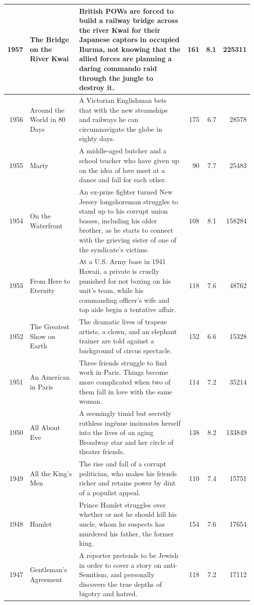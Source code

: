 \documentclass[
]{book}
\begin{document}
\begin{tabular}{r|l|l|r|r|r}
\hline
1957 & The Bridge on the River Kwai & British POWs are forced to build a railway bridge across the river Kwai for their Japanese captors in occupied Burma, not knowing that the allied forces are planning a daring commando raid through the jungle to destroy it. & 161 & 8.1 & 225311\\
\hline
1956 & Around the World in 80 Days & A Victorian Englishman bets that with the new steamships and railways he can circumnavigate the globe in eighty days. & 175 & 6.7 & 28578\\
\hline
1955 & Marty & A middle-aged butcher and a school teacher who have given up on the idea of love meet at a dance and fall for each other. & 90 & 7.7 & 25483\\
\hline
1954 & On the Waterfront & An ex-prize fighter turned New Jersey longshoreman struggles to stand up to his corrupt union bosses, including his older brother, as he starts to connect with the grieving sister of one of the syndicate's victims. & 108 & 8.1 & 158284\\
\hline
1953 & From Here to Eternity & At a U.S. Army base in 1941 Hawaii, a private is cruelly punished for not boxing on his unit's team, while his commanding officer's wife and top aide begin a tentative affair. & 118 & 7.6 & 48762\\
\hline
1952 & The Greatest Show on Earth & The dramatic lives of trapeze artists, a clown, and an elephant trainer are told against a background of circus spectacle. & 152 & 6.6 & 15328\\
\hline
1951 & An American in Paris & Three friends struggle to find work in Paris. Things become more complicated when two of them fall in love with the same woman. & 114 & 7.2 & 35214\\
\hline
1950 & All About Eve & A seemingly timid but secretly ruthless ingénue insinuates herself into the lives of an aging Broadway star and her circle of theater friends. & 138 & 8.2 & 133849\\
\hline
1949 & All the King's Men & The rise and fall of a corrupt politician, who makes his friends richer and retains power by dint of a populist appeal. & 110 & 7.4 & 15751\\
\hline
1948 & Hamlet & Prince Hamlet struggles over whether or not he should kill his uncle, whom he suspects has murdered his father, the former king. & 154 & 7.6 & 17654\\
\hline
1947 & Gentleman's Agreement & A reporter pretends to be Jewish in order to cover a story on anti-Semitism, and personally discovers the true depths of bigotry and hatred. & 118 & 7.2 & 17112\\

\end{tabular}
\end{document}
